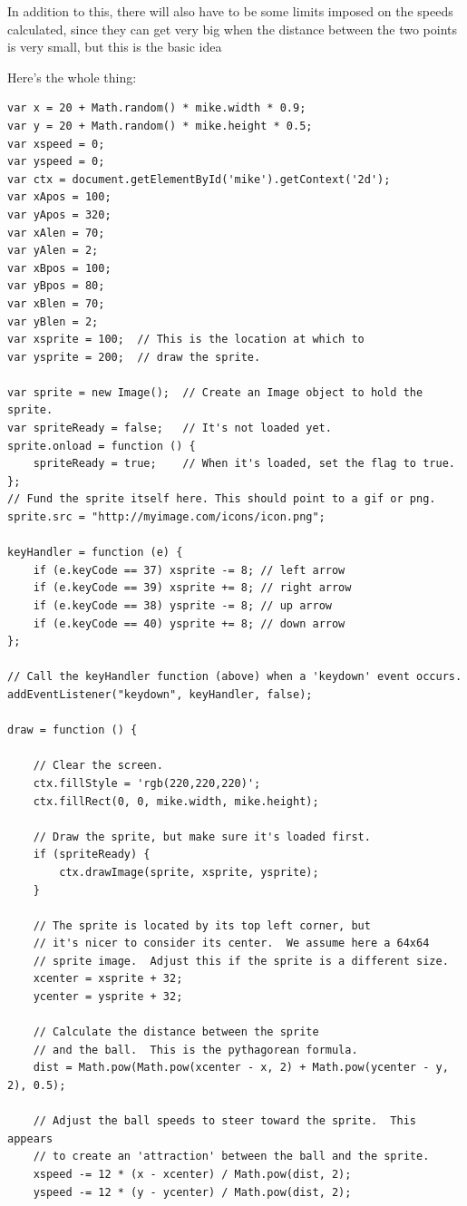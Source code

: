 \documentclass[11pt]{article}
\begin{document}
In addition to this, there will also have to be some limits imposed on
the speeds calculated, since they can get very big when the distance
between the two points is very small, but this is the basic idea

Here's the whole thing:

\begin{verbatim}
var x = 20 + Math.random() * mike.width * 0.9;
var y = 20 + Math.random() * mike.height * 0.5;
var xspeed = 0;
var yspeed = 0;
var ctx = document.getElementById('mike').getContext('2d');
var xApos = 100;
var yApos = 320;
var xAlen = 70;
var yAlen = 2;
var xBpos = 100;
var yBpos = 80;
var xBlen = 70;
var yBlen = 2;
var xsprite = 100;  // This is the location at which to
var ysprite = 200;  // draw the sprite.

var sprite = new Image();  // Create an Image object to hold the sprite.
var spriteReady = false;   // It's not loaded yet.
sprite.onload = function () {
    spriteReady = true;    // When it's loaded, set the flag to true.
};
// Fund the sprite itself here. This should point to a gif or png.
sprite.src = "http://myimage.com/icons/icon.png";

keyHandler = function (e) {
    if (e.keyCode == 37) xsprite -= 8; // left arrow
    if (e.keyCode == 39) xsprite += 8; // right arrow
    if (e.keyCode == 38) ysprite -= 8; // up arrow
    if (e.keyCode == 40) ysprite += 8; // down arrow
};

// Call the keyHandler function (above) when a 'keydown' event occurs.
addEventListener("keydown", keyHandler, false);

draw = function () {

    // Clear the screen.
    ctx.fillStyle = 'rgb(220,220,220)';
    ctx.fillRect(0, 0, mike.width, mike.height);

    // Draw the sprite, but make sure it's loaded first.
    if (spriteReady) {
        ctx.drawImage(sprite, xsprite, ysprite);
    }

    // The sprite is located by its top left corner, but
    // it's nicer to consider its center.  We assume here a 64x64
    // sprite image.  Adjust this if the sprite is a different size.
    xcenter = xsprite + 32;
    ycenter = ysprite + 32;

    // Calculate the distance between the sprite
    // and the ball.  This is the pythagorean formula.
    dist = Math.pow(Math.pow(xcenter - x, 2) + Math.pow(ycenter - y, 2), 0.5);

    // Adjust the ball speeds to steer toward the sprite.  This appears
    // to create an 'attraction' between the ball and the sprite.
    xspeed -= 12 * (x - xcenter) / Math.pow(dist, 2);
    yspeed -= 12 * (y - ycenter) / Math.pow(dist, 2);


\end{verbatim}
\end{document}
